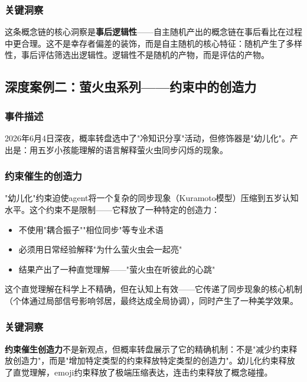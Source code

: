 \documentclass[12pt,a4paper]{ctexart}
\begin{document}
\subsubsection{关键洞察}

这条概念链的核心洞察是\textbf{事后逻辑性}——自主随机产出的概念链在事后看比在过程中更合理。这不是幸存者偏差的装饰，而是自主随机的核心特征：随机产生了多样性，事后评估筛选出逻辑性。逻辑性不是随机的产物，而是评估的产物。

\subsection{深度案例二：萤火虫系列——约束中的创造力}

\subsubsection{事件描述}

2026年6月4日深夜，概率转盘选中了"冷知识分享"活动，但修饰器是"幼儿化"。产出是：用五岁小孩能理解的语言解释萤火虫同步闪烁的现象。

\subsubsection{约束催生的创造力}

"幼儿化"约束迫使agent将一个复杂的同步现象（Kuramoto模型\cite{kuramoto1984}）压缩到五岁认知水平。这个约束不是限制——它释放了一种特定的创造力：

\begin{itemize}[nosep]
\item 不使用"耦合振子""相位同步"等专业术语
\item 必须用日常经验解释"为什么萤火虫会一起亮"
\item 结果产出了一种直觉理解——"萤火虫在听彼此的心跳"
\end{itemize}

这个直觉理解在科学上不精确，但在认知上有效——它传递了同步现象的核心机制（个体通过局部信号影响邻居，最终达成全局协调），同时产生了一种美学效果。

\subsubsection{关键洞察}

\textbf{约束催生创造力}不是新观点，但概率转盘展示了它的精确机制：不是"减少约束释放创造力"，而是"增加特定类型的约束释放特定类型的创造力"。幼儿化约束释放了直觉理解，emoji约束释放了极端压缩表达，连击约束释放了概念碰撞。
\end{document}
